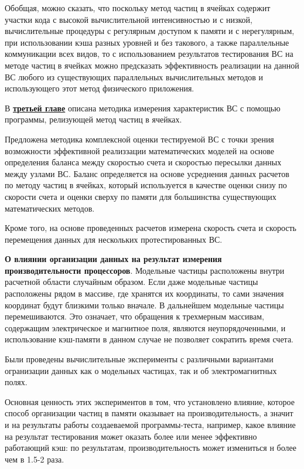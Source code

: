 Обобщая, можно сказать, что поскольку метод частиц в ячейках содержит участки кода с высокой вычислительной интенсивностью и с низкой, вычислительные процедуры с регулярным доступом к памяти и с нерегулярным, при использовании кэша разных уровней и без такового, а также параллельные коммуникации всех видов, то с использованием результатов тестирования ВС на методе частиц в ячейках можно предсказать эффективность реализации на данной ВС любого из существующих параллельных вычислительных методов и использующего этот метод физического приложения.

В \underline{\textbf{третьей главе}} описана методика измерения характеристик ВС с помощью программы, релизующей метод частиц в ячейках. 

Предложена методика комплексной оценки тестируемой ВС с точки зрения возможности эффективной реализзации математических моделей на основе определения баланса между скоростью счета и скоростью пересылки данных между узлами ВС. Баланс определяется на основе усреднения данных расчетов по методу частиц в ячейках, который используется в качестве оценки снизу по скорости счета и оценки сверху по памяти для большинства существующих математических методов.

Кроме того, на основе проведенных расчетов измерена скорость счета и скорость перемещения данных для нескольких протестированных ВС.

\textbf{О влиянии организации данных на результат измерения производительности процессоров}.
Модельные частицы расположены внутри расчетной области случайным образом. Если даже модельные частицы расположены рядом в массиве, где хранятся их координаты,  то сами значения координат будут близкими только вначале. В дальнейшем модельные частицы перемешиваются. Это означает, что обращения к трехмерным массивам, содержащим электрическое и магнитное поля, являются неупорядоченными,  и использование кэш-памяти в данном случае не позволяет сократить время счета. 

Были проведены вычислительные эксперименты с различными вариантами огранизации данных как о модельных частицах, так и об электромагнитных полях.

Основная ценность этих экспериментов в том, что установлено влияние, которое способ организации частиц в памяти оказывает на производительность, а значит и на результаты работы создаеваемой программы-теста, например, какое влияние на результат тестирования может оказать более или менее эффективно работающий кэш: по результатам, производительность может измениться н более чем в 1.5-2 раза.

